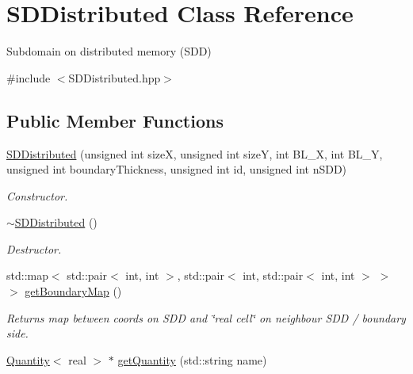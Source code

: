 \hypertarget{classSDDistributed}{}\section{S\+D\+Distributed Class Reference}
\label{classSDDistributed}


Subdomain on distributed memory (S\+DD)  




{\ttfamily \#include $<$S\+D\+Distributed.\+hpp$>$}

\subsection*{Public Member Functions}
\begin{DoxyCompactItemize}
\item 
\hyperlink{classSDDistributed_a4ba8b15a2b28fcbf04d3665075918510}{S\+D\+Distributed} (unsigned int sizeX, unsigned int sizeY, int B\+L\+\_\+X, int B\+L\+\_\+Y, unsigned int boundary\+Thickness, unsigned int id, unsigned int n\+S\+DD)
\begin{DoxyCompactList}\small\item\em Constructor. \end{DoxyCompactList}\item 
\mbox{\label{classSDDistributed_a1af9779279416a7bd519747e3b029124}} 
\hyperlink{classSDDistributed_a1af9779279416a7bd519747e3b029124}{$\sim$\+S\+D\+Distributed} ()
\begin{DoxyCompactList}\small\item\em Destructor. \end{DoxyCompactList}\item 
\mbox{\label{classSDDistributed_a3617b83f6f2a6368b1f17c938d921e0a}} 
std\+::map$<$ std\+::pair$<$ int, int $>$, std\+::pair$<$ int, std\+::pair$<$ int, int $>$ $>$ $>$ \hyperlink{classSDDistributed_a3617b83f6f2a6368b1f17c938d921e0a}{get\+Boundary\+Map} ()
\begin{DoxyCompactList}\small\item\em Returns map between coords on S\+DD and \char`\"{}real cell\char`\"{} on neighbour S\+DD / boundary side. \end{DoxyCompactList}\item 
\hyperlink{classQuantity}{Quantity}$<$ real $>$ $\ast$ \hyperlink{classSDDistributed_a14f296606ff1afa1e4878fa6c4928afc}{get\+Quantity} (std\+::string name)

\end{DoxyCompactItemize}

